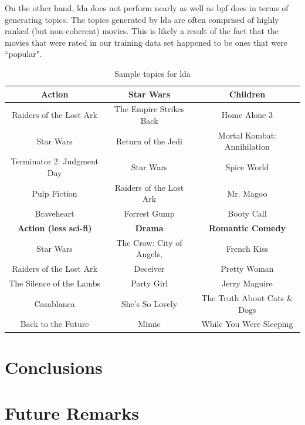 \documentclass{article} %
\begin{document}
On the other hand, \gls{lda} does not perform nearly as well as \gls{bpf} does in terms of generating topics. The topics generated by \gls{lda} are often comprised of highly ranked (but non-coherent) movies. This is likely a result of the fact that the movies that were rated in our training data set happened to be ones that were ``popular".
\begin{table}[h]
    \begin{tabularx}{\textwidth}{	ccc} \toprule
    \textbf{Action}                     & \textbf{Star Wars}               & \textbf{Children}                    \\ \midrule
    Raiders of the Lost Ark    & The Empire Strikes Back & Home Alone 3                \\
    Star Wars                  & Return of the Jedi      & Mortal Kombat: Annihilation \\
    Terminator 2: Judgment Day & Star Wars               & Spice World                 \\
    Pulp Fiction               & Raiders of the Lost Ark & Mr. Magoo                   \\
    Braveheart                 & Forrest Gump            & Booty Call                   \vspace{3mm} \\  \toprule
    \textbf{Action (less sci-fi)}     & \textbf{Drama}                     & \textbf{Romantic Comedy}              \\ \midrule
    Star Wars                & The Crow: City of Angels, & French Kiss                  \\
    Raiders of the Lost Ark  & Deceiver                  & Pretty Woman                 \\
    The Silence of the Lambs & Party Girl                & Jerry Maguire                \\
    Casablanca               & She's So Lovely           & The Truth About Cats \& Dogs \\
    Back to the Future       & Mimic                     & While You Were Sleeping      \\
    \end{tabularx}
    \caption {Sample topics for \gls{lda}}
\end{table}

\section{Conclusions}

\section{Future Remarks}



\end{document}

